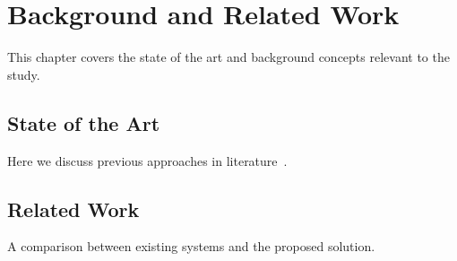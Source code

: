 \chapter{Background and Related Work}

This chapter covers the state of the art and background concepts relevant to the study.

\section{State of the Art}
Here we discuss previous approaches in literature~\cite{gamma1994design}.

\section{Related Work}
A comparison between existing systems and the proposed solution.

